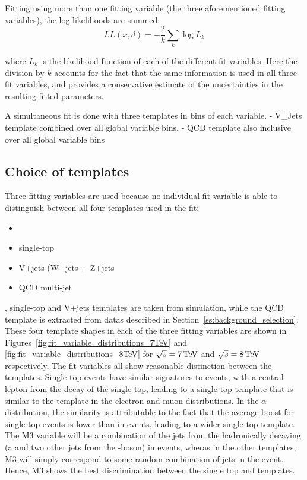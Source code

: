 Fitting using more than one fitting variable (the three aforementioned fitting variables), the log likelihoods
are summed:
\begin{equation}
\label{eq:log_L_final}
LL\left(x, d\right) = -\frac{2}{k} \sum\limits_{k} \log{L_k}
\end{equation}

where $L_k$ is the likelihood function of each of the different fit variables. Here the division by $k$
accounts for the fact that the same information is used in all three fit variables, and provides a
conservative estimate of the uncertainties in the resulting fitted parameters.

A simultaneous fit is done with three templates in bins of
each variable.
- V\_Jets template combined over all global variable bins.
- QCD template also inclusive over all global variable bins



\subsection{Choice of templates}
\label{choice_of_templates}

Three fitting variables are used because no individual fit variable is able to distinguish between all four
templates used in the fit:

\begin{itemize}
  \item {\ttbar}
  \item{single-top}
  \item{V+jets (W+jets + Z+jets}
  \item{QCD multi-jet} 
\end{itemize}

\ttbar, single-top and V+jets templates are taken from simulation, while the QCD template is extracted from
datas described in Section~\ref{ss:background_selection}. These four template shapes in each of the three
fitting variables are shown in Figures~\ref{fig:fit_variable_distributions_7TeV} and
\ref{fig:fit_variable_distributions_8TeV} for $\sqrt{s}=7\,\text{Te\hspace{-.08em}V}$ and $\sqrt{s}=8\,\text{Te\hspace{-.08em}V}$ respectively. The fit
variables all show reasonable distinction between the templates. Single top events have similar signatures to
\ttbar events, with a central lepton from the decay of the single top, leading to a single top template that
is similar to the \ttbar template in the electron \abseta and muon \abseta distributions. In the $\alpha$
distribution, the similarity is attributable to the fact that the average boost for single top events is lower
than in \ttbar events, leading to a wider single top template. The M3 variable will be a combination of the
jets from the hadronically decaying \tquark (a \bjet and two other jets from the \W-boson) in \ttbar events,
wheras in the other templates, M3 will simply correspond to some random combination of jets in the event.
Hence, M3 shows the best discrimination between the single top and \ttbar templates.

